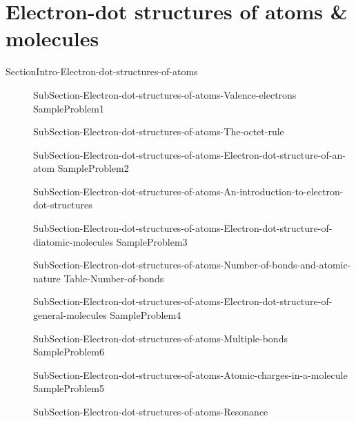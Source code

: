 \documentclass[main.tex]{subfiles}
\newcommand\chapterlabel{Ch-electronicstructure}\setcounter{figurenewcounter}{0}\setcounter{tablenewcounter}{0}\setcounter{formulanewcounter}{0}\chapterpicture{../{\chapterlabel}/figure1}\chapterpicturelabel{PxFuel}
\begin{document}
\section{Electron-dot structures of atoms \& molecules}{SectionIntro-Electron-dot-structures-of-atoms}
\sloppy\begin{description}
\item[] {SubSection-Electron-dot-structures-of-atoms-Valence-electrons}
{SampleProblem1}
\item[] {SubSection-Electron-dot-structures-of-atoms-The-octet-rule}
\item[] {SubSection-Electron-dot-structures-of-atoms-Electron-dot-structure-of-an-atom}
{SampleProblem2}
\item[] {SubSection-Electron-dot-structures-of-atoms-An-introduction-to-electron-dot-structures}
\item[] {SubSection-Electron-dot-structures-of-atoms-Electron-dot-structure-of-diatomic-molecules}
{SampleProblem3}
\item[] {SubSection-Electron-dot-structures-of-atoms-Number-of-bonds-and-atomic-nature}
  {Table-Number-of-bonds}
\item[] {SubSection-Electron-dot-structures-of-atoms-Electron-dot-structure-of-general-molecules}
{SampleProblem4}
\item[] {SubSection-Electron-dot-structures-of-atoms-Multiple-bonds}
{SampleProblem6}
\item[] {SubSection-Electron-dot-structures-of-atoms-Atomic-charges-in-a-molecule}
{SampleProblem5}
\item[] {SubSection-Electron-dot-structures-of-atoms-Resonance}

\end{description}
\end{document}
